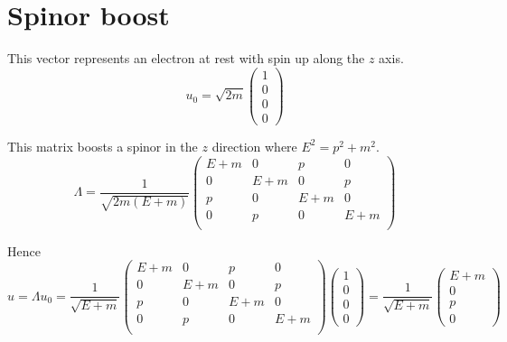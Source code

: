 



\section*{Spinor boost}

This vector represents an electron at rest with spin up along the $z$ axis.
\begin{equation*}
u_0=\sqrt{2m}\begin{pmatrix}1\\0\\0\\0\end{pmatrix}
\end{equation*}

This matrix boosts a spinor in the $z$ direction where $E^2=p^2+m^2$.
\begin{equation*}
\Lambda=\frac{1}{\sqrt{2m(E+m)}}
\begin{pmatrix}
E+m & 0 & p & 0\\
0 & E+m & 0 & p\\
p & 0 & E+m & 0\\
0 & p & 0 & E+m\\
\end{pmatrix}
\end{equation*}

Hence
\begin{equation*}
u=\Lambda u_0=\frac{1}{\sqrt{E+m}}
\begin{pmatrix}
E+m & 0 & p & 0\\
0 & E+m & 0 & p\\
p & 0 & E+m & 0\\
0 & p & 0 & E+m\\
\end{pmatrix}
\begin{pmatrix}1\\0\\0\\0\end{pmatrix}
=\frac{1}{\sqrt{E+m}}\begin{pmatrix}E+m\\0\\p\\0\end{pmatrix}
\end{equation*}


